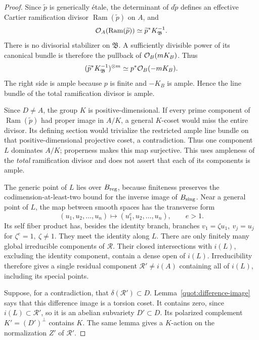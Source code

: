 \begin{proof}
Since \(\widetilde p\) is generically étale, the determinant of
\(d\widetilde p\) defines an effective Cartier
ramification divisor \(\operatorname{Ram}(\widetilde p)\) on \(A\), and
\[
             \mathcal O_A(\operatorname{Ram}(\widetilde p))
                        \simeq \widetilde p^*K_{\mathfrak B}^{-1}.
\]
There is no divisorial stabilizer on \(\mathfrak B\).
A sufficiently divisible power of its canonical bundle is therefore
the pullback of \(\mathcal O_B(mK_B)\).  Thus
\[
 (\widetilde p^*K_{\mathfrak B}^{-1})^{\otimes m}
                           \simeq p^*\mathcal O_B(-mK_B).
\]
The right side is ample because \(p\) is finite and \(-K_B\) is ample.
Hence the line bundle of the total ramification divisor is ample.

Since \(D\ne A\), the group \(K\) is positive-dimensional.
If every prime component of \(\operatorname{Ram}(\widetilde p)\) had proper
image in \(A/K\), a general \(K\)-coset would miss the entire divisor.
Its defining section would trivialize the restricted ample line
bundle on that positive-dimensional projective coset, a contradiction.
Thus one component \(L\) dominates \(A/K\); properness makes this
map surjective.  This uses ampleness of the \emph{total} ramification
divisor and does not assert that each of its components is ample.

The generic point of \(L\) lies over \(B_{\rm reg}\), because
finiteness preserves the codimension-at-least-two bound for the
inverse image of \(B_{\rm sing}\).
Near a general point of \(L\), the map between smooth spaces has
the transverse form
\[
               (u_1,u_2,\ldots,u_n)
                  \longmapsto(u_1^e,u_2,\ldots,u_n),
                         \qquad e>1.
\]
Its self fiber product has, besides the identity branch, branches
\(v_1=\zeta u_1,\ v_j=u_j\) for \(\zeta^e=1,\ \zeta\ne1\).
They meet the identity along \(L\).
There are only finitely many global irreducible components of
\(\mathcal R\).  Their closed intersections with \(i(L)\), excluding
the identity component, contain a dense open of \(i(L)\).
Irreducibility therefore gives a single residual component
\(\mathcal R'\ne i(A)\) containing all of \(i(L)\), including its
special points.

Suppose, for a contradiction, that \(\delta(\mathcal R')\subset D\).
Lemma~\ref{quot:difference-image} says that this difference image is a
torsion coset.  It contains zero, since \(i(L)\subset\mathcal R'\),
so it is an abelian subvariety \(D'\subset D\).
Its polarized complement \(K'=(D')^\perp\) contains \(K\).
The same lemma gives a \(K\)-action on the normalization \(Z'\) of
\(\mathcal R'\).


\end{proof}
